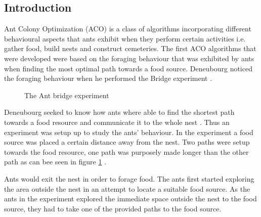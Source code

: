 \subsection{Introduction}
\label{sec:ACOverview}
Ant Colony Optimization (ACO) is a class of algorithms incorporating different behavioural aspects that ants exhibit when they perform certain activities i.e. gather food, build nests and construct cemeteries\cite{AntsAndStigmergy,CompuIntelligenceIntro}. The first ACO algorithms that were developed were based on the foraging behaviour that was exhibited by ants when finding the most optimal path towards a food source. Deneubourg noticed the foraging behaviour when he performed the Bridge experiment \cite{AntsAndStigmergy,CompuIntelligenceIntro}.
\begin{figure}[b!]
	\centering
	\setlength \fboxsep{0pt}
	\setlength \fboxrule{0.5pt}
	\caption{The Ant bridge experiment \cite{AntsAndStigmergy}}
	\label{fig:antBridgeExperiment}
\end{figure}

Deneubourg seeked to know how ants where able to find the shortest path towards a food resource and communicate it to the whole nest \cite{AntsAndStigmergy}. Thus an experiment was setup up to study the ants' behaviour. In the experiment a food source was placed a certain distance away from the nest\cite{AntsAndStigmergy,CompuIntelligenceIntro}. Two paths were setup towards the food resource, one path was purposely made longer than the other path as can bee seen in figure \ref{fig:antBridgeExperiment} \cite{AntsAndStigmergy}.

Ants would exit the nest in order to forage food\cite{AntsAndStigmergy,CompuIntelligenceIntro}. The ants first started exploring the area outside the nest in an attempt to locate a suitable food source\cite{AntsAndStigmergy,CompuIntelligenceIntro}. As the ants in the experiment explored the immediate space outside the nest to the food source, they had to take one of the provided paths to the food source\cite{AntsAndStigmergy}.

